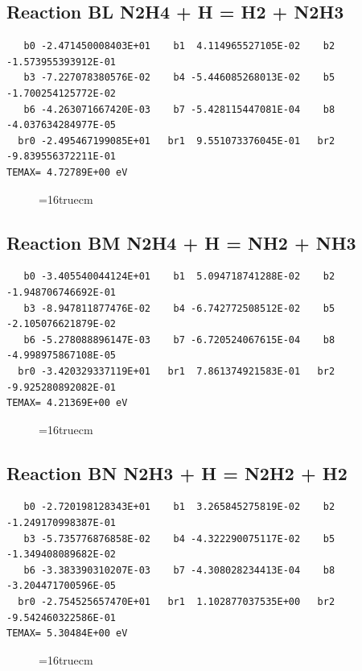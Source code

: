 \documentclass[12pt,dvipdfm]{article}
\begin{document}
\subsection{
Reaction BL N2H4 + H = H2 + N2H3  }
\begin{small}\begin{verbatim}
   b0 -2.471450008403E+01    b1  4.114965527105E-02    b2 -1.573955393912E-01
   b3 -7.227078380576E-02    b4 -5.446085268013E-02    b5 -1.700254125772E-02
   b6 -4.263071667420E-03    b7 -5.428115447081E-04    b8 -4.037634284977E-05
  br0 -2.495467199085E+01   br1  9.551073376045E-01   br2 -9.839556372211E-01
TEMAX= 4.72789E+00 eV
   \end{verbatim}\end{small}
\begin{figure}[h!]
\label{n2rates}
\epsfxsize=16truecm
\end{figure}
\newpage

\subsection{
Reaction BM N2H4 + H = NH2 + NH3}
\begin{small}\begin{verbatim}
   b0 -3.405540044124E+01    b1  5.094718741288E-02    b2 -1.948706746692E-01
   b3 -8.947811877476E-02    b4 -6.742772508512E-02    b5 -2.105076621879E-02
   b6 -5.278088896147E-03    b7 -6.720524067615E-04    b8 -4.998975867108E-05
  br0 -3.420329337119E+01   br1  7.861374921583E-01   br2 -9.925280892082E-01
TEMAX= 4.21369E+00 eV
   \end{verbatim}\end{small}
\begin{figure}[h!]
\label{n2rates}
\epsfxsize=16truecm
\end{figure}
\newpage

\subsection{
Reaction BN N2H3 + H = N2H2 + H2 }
\begin{small}\begin{verbatim}
   b0 -2.720198128343E+01    b1  3.265845275819E-02    b2 -1.249170998387E-01
   b3 -5.735776876858E-02    b4 -4.322290075117E-02    b5 -1.349408089682E-02
   b6 -3.383390310207E-03    b7 -4.308028234413E-04    b8 -3.204471700596E-05
  br0 -2.754525657470E+01   br1  1.102877037535E+00   br2 -9.542460322586E-01
TEMAX= 5.30484E+00 eV
   \end{verbatim}\end{small}
\begin{figure}[h!]
\label{n2rates}
\epsfxsize=16truecm
\end{figure}
\newpage
\end{document}
